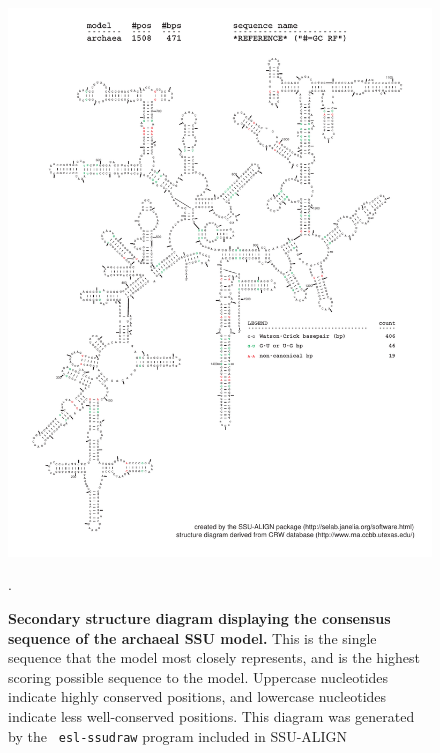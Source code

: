 \vspace{0.2in}
\newpage

\begin{figure}
\begin{center}
\includegraphics[width=5.7in]{Figures/archaea-0p1-rf}
\end{center}
\caption[Secondary structure diagram displaying the consensus sequence
  of the archaeal SSU model]{\textbf{Secondary structure diagram displaying the
  consensus sequence of the archaeal SSU model.} 
  This is the single sequence that the model 
  most closely represents, and is the highest scoring possible
  sequence to the model. Uppercase nucleotides indicate highly conserved positions,
  and lowercase nucleotides indicate less well-conserved positions.
  This diagram was generated by the {\tt
  esl-ssudraw} program included in SSU-ALIGN}.
\label{fig:arcrf}
\end{figure}


